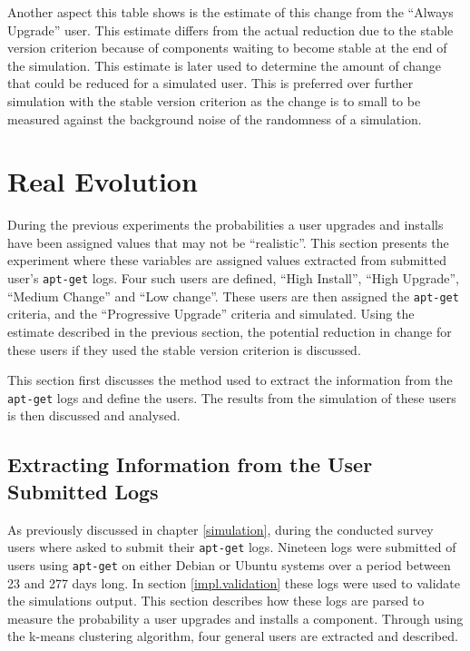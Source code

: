 Another aspect this table shows is the estimate of this change from the ``Always Upgrade'' user.
This estimate differs from the actual reduction due to the stable version criterion because of components waiting to become stable at the end of the simulation.
This estimate is later used to determine the amount of change that could be reduced for a simulated user.
This is preferred over further simulation with the stable version criterion as the change is to small to be measured against the background noise of the randomness of a simulation. 

\section{Real Evolution}
\label{exp.realuserssim}
During the previous experiments the probabilities a user upgrades and installs have been assigned values that may not be ``realistic''.
This section presents the experiment where these variables are assigned values extracted from submitted user's \texttt{apt-get} logs.
Four such users are defined, ``High Install'', ``High Upgrade'', ``Medium Change'' and ``Low change''.
These users are then assigned the \texttt{apt-get} criteria, and the ``Progressive Upgrade'' criteria and simulated.
Using the estimate described in the previous section, the potential reduction in change for these users if they used the stable version criterion is discussed.

This section first discusses the method used to extract the information from the \texttt{apt-get} logs and define the users.
The results from the simulation of these users is then discussed and analysed.

\subsection{Extracting Information from the User Submitted Logs}
As previously discussed in chapter \ref{simulation}, during the conducted survey users where asked to submit their \texttt{apt-get} logs.
Nineteen logs were submitted of users using \texttt{apt-get} on either Debian or Ubuntu systems over a period between 23 and 277 days long. 
In section \ref{impl.validation} these logs were used to validate the simulations output.
This section describes how these logs are parsed to measure the probability a user upgrades and installs a component.
Through using the k-means clustering algorithm, four general users are extracted and described.

